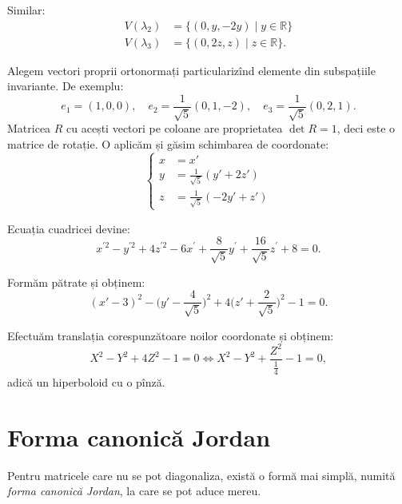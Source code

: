 \documentclass[11pt,a4paper]{article}
\newcommand\RR{\mathbb{R}}
\theoremstyle{dotless}
\theoremstyle{dotlessdr}
\begin{document}
Similar:
\begin{align*}
  V(\lambda_2) &= \{ (0, y, -2y) \mid y \in \RR \} \\
  V(\lambda_3) &= \{ (0, 2z, z) \mid z \in \RR \}.
\end{align*}

Alegem vectori proprii ortonormați particularizînd elemente din subspațiile invariante.
De exemplu:
\[
  e_1 = (1, 0, 0), \quad e_2 = \frac{1}{\sqrt{5}} (0, 1, -2), \quad e_3 = \frac{1}{\sqrt{5}}(0, 2, 1).
\]
Matricea $R$ cu acești vectori pe coloane are proprietatea $\det R = 1$, deci este o matrice
de rotație. O aplicăm și găsim schimbarea de coordonate:
\[
  \begin{cases}
    x &= x' \\
    y &= \frac{1}{\sqrt{5}} (y' + 2z') \\
    z &= \frac{1}{\sqrt{5}} (-2y' + z')
  \end{cases}
\]

Ecuația cuadricei devine:
\[
  x^{\prime 2} - y^{\prime 2} + 4 z^{\prime 2} - 6x^\prime + %
  \frac{8}{\sqrt{5}} y^\prime + \frac{16}{\sqrt{5}} z^\prime + 8 = 0.
\]

Formăm pătrate și obținem:
\[
  (x' - 3)^2 - \big( y' - \frac{4}{\sqrt{5}} \big)^2 + 4 \big(z' + \frac{2}{\sqrt{5}} \big)^2 - 1 = 0.
\]

Efectuăm translația corespunzătoare noilor coordonate și obținem:
\[
  X^2 - Y^2 + 4Z^2 - 1 = 0 \Leftrightarrow X^2 - Y^2 + \frac{Z^2}{\frac{1}{4}} - 1 = 0,
\]
adică un hiperboloid cu o pînză.


\section{Forma canonică Jordan}
\label{sec:jordan}

Pentru matricele care nu se pot diagonaliza, există o formă mai simplă, numită
\emph{forma canonică Jordan}, la care se pot aduce mereu.
\end{document}
